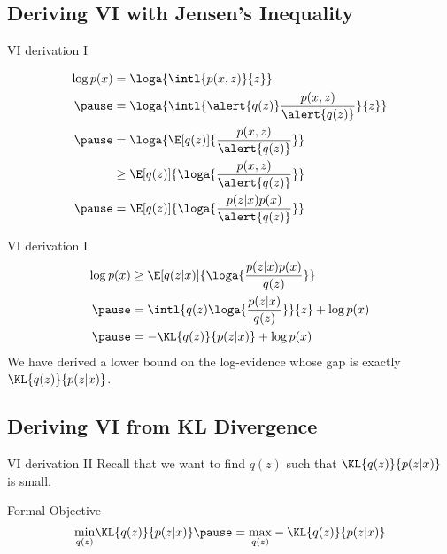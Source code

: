 \documentclass[14pt, aspectratio=169]{beamer}
\begin{document}
\subsection{Deriving VI with Jensen's Inequality}

\begin{frame}{VI derivation I}
\begin{small}
\begin{equation*}
\begin{aligned}
\log p(x) &= \loga{\intl{p(x,z)}{z}} \\
\pause
&= \loga{\intl{\alert{q(z)}\frac{p(x,z)}{\alert{q(z)}}}{z}} \\
\pause
&= \loga{\E[q(z)]{\frac{p(x,z)}{\alert{q(z)}}}} \\
&\geq \E[q(z)]{  \loga{\frac{p(x,z)}{\alert{q(z)}}}} \\
\pause
& = \E[q(z)] {\loga{\frac{p(z|x)p(x)}{\alert{q(z)}}}}
\end{aligned}
\end{equation*}
\end{small}
\end{frame}

\begin{frame}{VI derivation I}
\begin{equation*}
\begin{aligned}
\log p(x) &\geq 
\E[q(z|x)] {\loga{\frac{p(z|x)p(x)}{q(z)}}} \\
\pause
&= \intl{ q(z) \loga{\frac{p(z|x)}{q(z)}}}{z} + \log p(x) \\
\pause
&= -\KL{q(z)}{p(z|x)} + \log p(x)
\end{aligned}
\end{equation*}
\pause
We have derived a lower bound on the log-evidence whose gap is exactly $ \KL{q(z)}{p(z|x)} $.
\end{frame}

\subsection{Deriving VI from KL Divergence}

\begin{frame}{VI derivation II}
Recall that we want to find $ q(z) $ such that $ \KL{q(z)}{p(z|x)} $ is small.
\pause
\begin{block}{Formal Objective}
\begin{equation*}
\underset{q(z)}{\min} \KL{q(z)}{p(z|x)} \pause = \underset{q(z)}{\max} -\KL{q(z)}{p(z|x)}
\end{equation*}
\end{block}
\end{frame}
\end{document}
